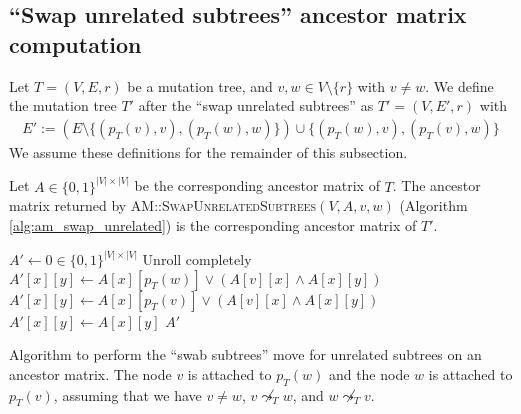 \subsection{``Swap unrelated subtrees'' ancestor matrix computation}

\begin{definition}
    \label{def:swap_unrelated_subtrees}
    Let $T = (V, E, r)$ be a mutation tree, and $v, w \in V \setminus \{r\}$ with $v \neq w$. We define the mutation tree $T'$ after the ``swap unrelated subtrees'' as $T' = (V, E', r)$ with
    \begin{align*}
        E' := (E \setminus \{(p_T(v), v), (p_T(w), w)\}) \cup \{(p_T(w), v), (p_T(v), w)\}
    \end{align*}
    We assume these definitions for the remainder of this subsection.
\end{definition}

\begin{theorem}
    \label{theo:swap_unrelated_correctness}
    Let $A \in \{0,1\}^{|V| \times |V|}$ be the corresponding ancestor matrix of $T$. The ancestor matrix returned by \textsc{AM::Swap\-Unrelated\-Subtrees}$(V, A, v, w)$ (Algorithm \ref{alg:am_swap_unrelated}) is the corresponding ancestor matrix of $T'$.
\end{theorem}

\begin{algorithm}
    \begin{algorithmic}[1]
        \State $A' \leftarrow 0 \in \{0,1\}^{|V| \times |V|}$
             \Comment Unroll completely
                    \State $A'[x][y] \leftarrow A[x][p_T(w)] \vee (A[v][x] \wedge A[x][y])$
                    \State $A'[x][y] \leftarrow A[x][p_T(v)] \vee (A[v][x] \wedge A[x][y])$
                \Else
                    \State $A'[x][y] \leftarrow A[x][y]$
                \EndIf
            \EndFor
        \EndFor
        \State \Return $A'$
        \EndFunction
    \end{algorithmic}
    \caption{Algorithm to perform the ``swab subtrees'' move for unrelated subtrees on an ancestor matrix. The node $v$ is attached to $p_T(w)$ and the node $w$ is attached to $p_T(v)$, assuming that we have $v \neq w$, $v \not\leadsto_T w$, and $w \not\leadsto_T v$.}
    \label{alg:am_swap_unrelated}
\end{algorithm}

